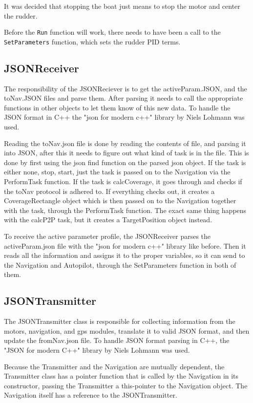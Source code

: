 It was decided that stopping the boat just means to stop the motor and center the rudder. 

Before the \texttt{Run} function will work, there needs to have been a call to the \texttt{SetParameters} function, which sets the rudder PID terms. 

\subsection{JSONReceiver}
The responsibility of the JSONReciever is to get the activeParam.JSON, and the toNav.JSON files and parse them. After parsing it needs to call the appropriate functions in other objects to let them know of this new data. To handle the JSON format in C++ the "json for modern c++" library by Niels Lohmann was used\cite{json}. 

Reading the toNav.json file is done by reading the contents of file, and parsing it into JSON, after this it needs to figure out what kind of task is in the file. This is done by first using the json find function on the parsed json object. If the task is either none, stop, start, just the task is passed on to the Navigation via the PerformTask function. If the task is calcCoverage, it goes through and checks if the toNav protocol is adhered to. If everything checks out, it creates a CoverageRectangle object which is then passed on to the Navigation together with the task, through the PerformTask function.
The exact same thing happens with the calcP2P task, but it creates a TargetPosition object instead.

To receive the active parameter profile, the JSONReceiver parses the activeParam.json file with the "json for modern c++" library like before. Then it reads all the information and assigns it to the proper variables, so it can send to the Navigation and Autopilot, through the SetParameters function in both of them.

\subsection{JSONTransmitter}
The  JSONTransmitter class is responsible for collecting information from the motors, navigation, and gps modules, translate it to valid JSON format, and then update the fromNav.json file. To handle JSON format parsing in C++, the "JSON for modern C++" library by Niels Lohmann was used\cite{json}. 

Because the Transmitter and the Navigation are mutually dependent, the Transmitter class has a pointer function that is called by the Navigation in its constructor, passing the Transmitter a this-pointer to the Navigation object. The Navigation itself has a reference to the JSONTransmitter.

